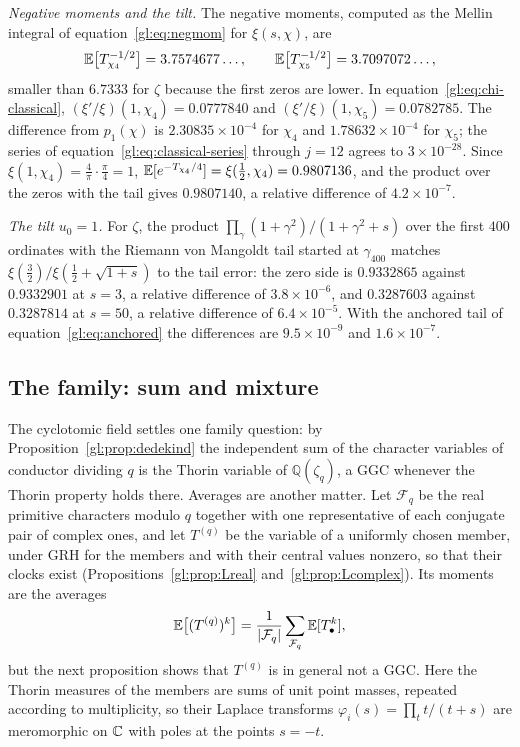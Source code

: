 \emph{Negative moments and the tilt.} The negative moments, computed as the Mellin integral of equation~\eqref{gl:eq:negmom} for $\xi(s,\chi)$, are
\[
\mathbb{E}\big[T_{\chi_4}^{-1/2}\big] = 3.7574677\ldots,\qquad \mathbb{E}\big[T_{\chi_5}^{-1/2}\big] = 3.7097072\ldots,
\]
smaller than $6.7333$ for $\zeta$ because the first zeros are lower. In equation~\eqref{gl:eq:chi-classical}, $(\xi'/\xi)(1,\chi_4)=0.0777840$ and $(\xi'/\xi)(1,\chi_5)=0.0782785$. The difference from $p_1(\chi)$ is $2.30835\times10^{-4}$ for $\chi_4$ and $1.78632\times10^{-4}$ for $\chi_5$; the series of equation~\eqref{gl:eq:classical-series} through $j=12$ agrees to $3\times10^{-28}$. Since $\xi(1,\chi_4)=\tfrac4\pi\cdot\tfrac\pi4=1$, $\mathbb{E}[e^{-T_{\chi_4}/4}]=\xi(\tfrac12,\chi_4)=0.9807136$, and the product over the zeros with the tail gives $0.9807140$, a relative difference of $4.2\times10^{-7}$.

\emph{The tilt $u_0=1$.} For $\zeta$, the product $\prod_\gamma(1+\gamma^2)/(1+\gamma^2+s)$ over the first $400$ ordinates with the Riemann von Mangoldt tail started at $\gamma_{400}$ matches $\xi(\tfrac32)/\xi(\tfrac12+\sqrt{1+s})$ to the tail error: the zero side is $0.9332865$ against $0.9332901$ at $s=3$, a relative difference of $3.8\times10^{-6}$, and $0.3287603$ against $0.3287814$ at $s=50$, a relative difference of $6.4\times10^{-5}$. With the anchored tail of equation~\eqref{gl:eq:anchored} the differences are $9.5\times10^{-9}$ and $1.6\times10^{-7}$.

\subsection{The family: sum and mixture}\label{gl:sec:family}

The cyclotomic field settles one family question: by Proposition~\ref{gl:prop:dedekind} the independent sum of the character variables of conductor dividing $q$ is the Thorin variable of $\mathbb Q(\zeta_q)$, a GGC whenever the Thorin property holds there. Averages are another matter. Let $\mathcal F_q$ be the real primitive characters modulo $q$ together with one representative of each conjugate pair of complex ones, and let $T^{(q)}$ be the variable of a uniformly chosen member, under GRH for the members and with their central values nonzero, so that their clocks exist (Propositions~\ref{gl:prop:Lreal} and~\ref{gl:prop:Lcomplex}). Its moments are the averages
\[
\mathbb{E}\big[(T^{(q)})^k\big] = \frac{1}{|\mathcal F_q|}\sum_{\mathcal F_q}\mathbb{E}[T_\bullet^k],
\]
but the next proposition shows that $T^{(q)}$ is in general not a GGC. Here the Thorin measures of the members are sums of unit point masses, repeated according to multiplicity, so their Laplace transforms $\varphi_i(s)=\prod_t t/(t+s)$ are meromorphic on $\mathbb{C}$ with poles at the points $s=-t$.

